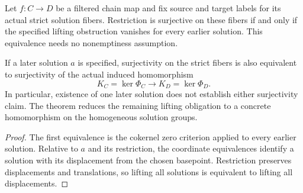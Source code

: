 \begin{lemma}
  \label{lem:strict-solution-restriction-surjectivity}
  \leanok
  Let $f:C\to D$ be a filtered chain map and fix source and target
  labels for its actual strict solution fibers.  Restriction is surjective
  on these fibers if and only if the specified lifting obstruction vanishes
  for every earlier solution.  This equivalence needs no nonemptiness
  assumption.

  If a later solution $a$ is specified, surjectivity on the strict fibers is
  also equivalent to surjectivity of the actual induced homomorphism
  \[
    K_C=\ker\Phi_C\longrightarrow K_D=\ker\Phi_D.
  \]
  In particular, existence of one later solution does not establish either
  surjectivity claim.  The theorem reduces the remaining lifting obligation
  to a concrete homomorphism on the homogeneous solution groups.
\end{lemma}
\begin{proof}
  \leanok
  The first equivalence is the cokernel zero criterion applied to every
  earlier solution.  Relative to $a$ and its restriction, the coordinate
  equivalences identify a solution with its displacement from the chosen
  basepoint.  Restriction preserves displacements and translations, so
  lifting all solutions is equivalent to lifting all displacements.
\end{proof}

